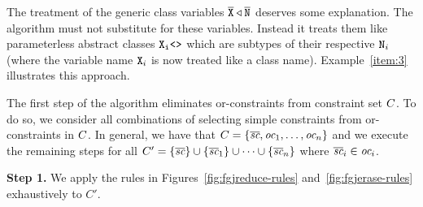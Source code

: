 The treatment of the generic class variables $\overline{\tt X} \triangleleft \overline{\tt N}$
deserves some explanation. The algorithm must not substitute
for these variables. Instead it treats them like parameterless
abstract classes $\mathtt{X_i \texttt{<}  \texttt{>} }$ which are subtypes of their
respective ${\tt N}_i$ (where the variable name ${\tt X}_i$ is now
treated like a class name). Example~\ref{item:3} illustrates this
approach.  

The first step of the algorithm eliminates or-constraints from constraint set $C$. To do so,
we consider all combinations of selecting simple constraints from
or-constraints in $C$. In general, we have that $C =
\{ \overline{\textit{sc}}, \textit{oc}_1, \dots, \textit{oc}_n \}$ and we
execute the remaining steps for all $C' = \{ \overline{\textit{sc}} \}
\cup \{ \overline{\textit{sc}}_1 \} \cup \dots \cup
\{ \overline{\textit{sc}}_n \}$ where $\overline{\textit{sc}}_i \in
\textit{oc}_i$. 



\textbf{Step 1.} We apply the rules in Figures~\ref{fig:fgjreduce-rules}
and~\ref{fig:fgjerase-rules} exhaustively to $C'$.

